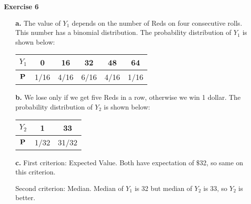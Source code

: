 \documentclass[10pt]{article}
\def\Pr{{\bf P}}
\begin{document}
{\bf Exercise 6}
\begin{itemize}
\item[\bf a.] The value of $Y_1$  depends on the number of Reds on four consecutive rolls. This number  has a binomial distribution. The probability distribution of $Y_1$ is shown below:
\begin{center}
\begin{tabular}{|c|c|c|c|c|c|}
\hline       
$Y_1$ & 0    & 16   & 32   & 48   & 64 \\
\hline
$\Pr$  & 1/16 & 4/16 & 6/16 & 4/16 & 1/16\\
\hline
\end{tabular}
\end{center}
\item[\bf b.] We lose only if we get five Reds in  a row, otherwise we win 1 dollar. The probability distribution of $Y_2$ is shown below:
\begin{center}
\begin{tabular}{|c|c|c|}
\hline       
$Y_2$ & 1    & 33\\
\hline 
$\Pr$  & 1/32 & 31/32\\
\hline
\end{tabular}
\end{center} 
\item[\bf c.] First criterion: Expected Value. Both have expectation of $\$$32, so same on this criterion.

Second criterion: Median. Median of $Y_1$ is 32 but  median of $Y_2$ is 33, so $Y_2$ is better.

\end{itemize}
\end{document}
